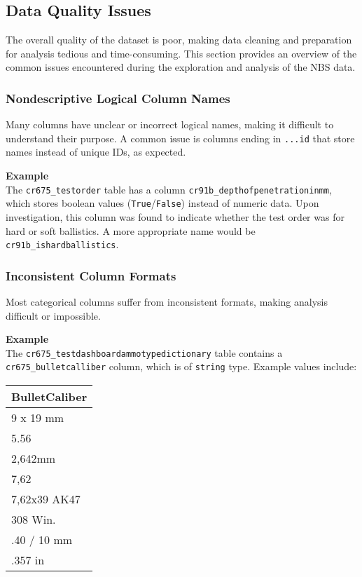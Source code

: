 \subsection{Data Quality Issues}

The overall quality of the dataset is poor, making data cleaning and preparation for analysis tedious and time-consuming. This section provides an overview of the common issues encountered during the exploration and analysis of the NBS data.

\subsubsection{Nondescriptive Logical Column Names}
Many columns have unclear or incorrect logical names, making it difficult to understand their purpose. A common issue is columns ending in \texttt{...id} that store names instead of unique IDs, as expected.

\textbf{Example}\\
The \texttt{cr675\_testorder} table has a column \texttt{cr91b\_depthofpenetrationinmm}, which stores boolean values (\texttt{True}/\texttt{False}) instead of numeric data. Upon investigation, this column was found to indicate whether the test order was for hard or soft ballistics. A more appropriate name would be \texttt{cr91b\_ishardballistics}.

\newpage

\subsubsection{Inconsistent Column Formats}
Most categorical columns suffer from inconsistent formats, making analysis difficult or impossible.

\textbf{Example}\\
The \texttt{cr675\_testdashboardammotypedictionary} table contains a \texttt{cr675\_bulletcalliber} column, which is of \texttt{string} type. Example values include:

\begin{table}[h!]
	\centering
	\begin{tabular}{|l|}
	\hline
	\textbf{BulletCaliber} \\
	\hline
	9 x 19 mm \\
	5.56 \\
	2,642mm \\
	7,62 \\
	7,62x39 AK47 \\
	308 Win. \\
	.40 / 10 mm \\
	.357 in \\
	\hline
	\end{tabular}
\end{table}


